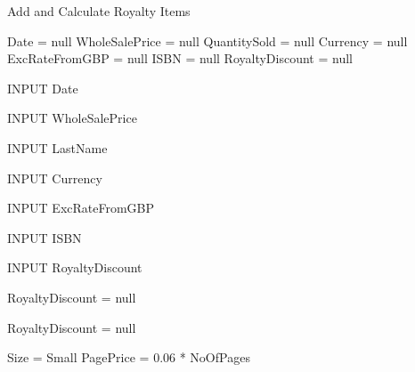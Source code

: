 \begin{algorithm}[H]
    \caption{Add and Calculate Royalty Items}
\begin{algorithmic}[1]



Date = null
WholeSalePrice = null
QuantitySold = null
Currency = null
ExcRateFromGBP = null
ISBN = null
RoyaltyDiscount = null


    INPUT Date

\EndWhile


    INPUT WholeSalePrice

\EndWhile


    INPUT LastName

\EndWhile


    INPUT Currency

\EndWhile



        INPUT ExcRateFromGBP

    \EndWhile

\EndIf


    INPUT ISBN

\EndWhile


    INPUT RoyaltyDiscount


        RoyaltyDiscount = null

    \EndIf


        RoyaltyDiscount = null

    \EndIf

\EndWhile


    Size = Small
    PagePrice = 0.06 * NoOfPages

        

\end{algorithmic}
\end{algorithm}
